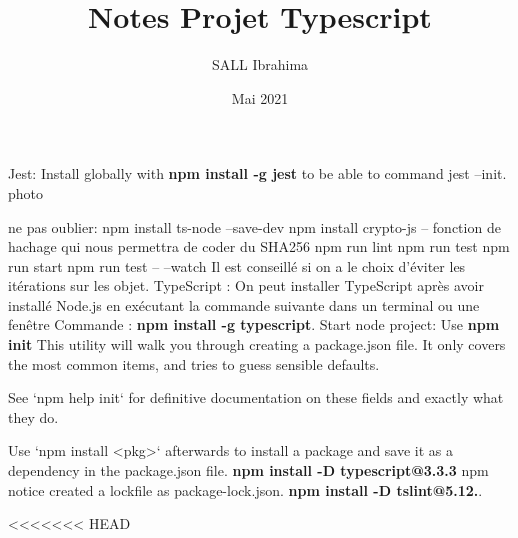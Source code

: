 \documentclass[table]{article}
\title{Notes Projet Typescript}
\author{SALL Ibrahima}
\date{Mai 2021}
\begin{document}



Jest: Install globally with \textbf{npm install -g jest} to be able to command jest --init.
photo

ne pas oublier:     npm install ts-node --save-dev
npm install crypto-js -- fonction de hachage qui nous permettra de coder du SHA256
npm run lint
npm run test 
npm run start
npm run test -- --watch
\newline Il est conseillé si on a le choix d'éviter les itérations sur les objet.
\newline TypeScript : On peut installer TypeScript après avoir installé Node.js en exécutant la commande suivante dans un terminal ou une fenêtre Commande : \textbf{npm install -g typescript}.
\newline Start node project: Use \textbf{npm init} 
This utility will walk you through creating a package.json file.
It only covers the most common items, and tries to guess sensible defaults.

See `npm help init` for definitive documentation on these fields
and exactly what they do.

Use `npm install <pkg>` afterwards to install a package and
save it as a dependency in the package.json file. 
\newline \textbf{npm install -D typescript@3.3.3} npm notice created a lockfile as package-lock.json.
\newline \textbf{npm install -D tslint@5.12.}.

<<<<<<< HEAD
\end{document}
